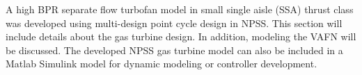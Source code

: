 
A high BPR separate flow turbofan model in small single aisle (SSA) thrust class 
was developed using multi-design point cycle design \cite{Schutte:2012:2,
Schutte:2012:1} in NPSS. This section will include details about the gas turbine 
design. In addition, modeling the VAFN will be discussed. The developed NPSS 
gas turbine model can also be included in a Matlab Simulink model for dynamic 
modeling or controller development.